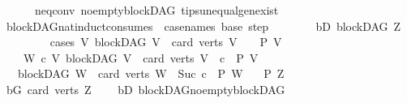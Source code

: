 \begin{isabellebody}
\ \ \ \ \ \ neq{}{\isacharunderscore}{\kern0pt}conv\ no{\isacharunderscore}{\kern0pt}empty{\isacharunderscore}{\kern0pt}blockDAG\ tips{\isacharunderscore}{\kern0pt}unequal{\isacharunderscore}{\kern0pt}gen{\isacharunderscore}{\kern0pt}exist{\isacharparenright}{\kern0pt}%
\endisatagproof
{\isafoldproof}%
%
\isadelimproof
\ \isanewline
%
\endisadelimproof
\isanewline
{}\isamarkupfalse%
\ blockDAG{\isacharunderscore}{\kern0pt}nat{\isacharunderscore}{\kern0pt}induct{\isacharbrackleft}{\kern0pt}consumes\ {}{\isacharcomma}{\kern0pt}\ case{\isacharunderscore}{\kern0pt}names\ base\ step{\isacharbrackright}{\kern0pt}{\isacharcolon}{\kern0pt}\ \isanewline
\ \ \isanewline
\ \ \ \ bD{\isacharcolon}{\kern0pt}\ {\isachardoublequoteopen}blockDAG\ Z{\isachardoublequoteclose}\isanewline
\ \ \ \ \isanewline
\ \ \ \ cases{\isacharcolon}{\kern0pt}\ {\isachardoublequoteopen}{\isasymAnd}V{\isachardot}{\kern0pt}\ {\isacharparenleft}{\kern0pt}blockDAG\ V\ {\isasymLongrightarrow}\ card\ {\isacharparenleft}{\kern0pt}verts\ V{\isacharparenright}{\kern0pt}\ {\isacharequal}{\kern0pt}\ {}\ {\isasymLongrightarrow}\ P\ V{\isacharparenright}{\kern0pt}{\isachardoublequoteclose}\isanewline
\ \ \ \ {\isachardoublequoteopen}{\isasymAnd}W\ c{\isachardot}{\kern0pt}\ {\isacharparenleft}{\kern0pt}{\isasymAnd}V{\isachardot}{\kern0pt}\ {\isacharparenleft}{\kern0pt}blockDAG\ V\ {\isasymLongrightarrow}\ card\ {\isacharparenleft}{\kern0pt}verts\ V{\isacharparenright}{\kern0pt}\ {\isacharequal}{\kern0pt}\ c\ {\isasymLongrightarrow}\ P\ V{\isacharparenright}{\kern0pt}{\isacharparenright}{\kern0pt}\ \isanewline
\ \ {\isasymLongrightarrow}\ {\isacharparenleft}{\kern0pt}blockDAG\ W\ {\isasymLongrightarrow}\ card\ {\isacharparenleft}{\kern0pt}verts\ W{\isacharparenright}{\kern0pt}\ {\isacharequal}{\kern0pt}\ Suc\ c\ {\isasymLongrightarrow}\ P\ W{\isacharparenright}{\kern0pt}{\isachardoublequoteclose}\isanewline
\ \ \ {\isachardoublequoteopen}P\ Z{\isachardoublequoteclose}\isanewline
%
\isadelimproof
%
\endisadelimproof
%
\isatagproof
{}\isamarkupfalse%
\ {\isacharminus}{\kern0pt}\ \isanewline
\ \ \isamarkupfalse%
\ bG{\isacharcolon}{\kern0pt}\ {\isachardoublequoteopen}card\ {\isacharparenleft}{\kern0pt}verts\ Z{\isacharparenright}{\kern0pt}\ {\isachargreater}{\kern0pt}\ {}{\isachardoublequoteclose}\ \isamarkupfalse%
\ bD\ blockDAG{\isachardot}{\kern0pt}no{\isacharunderscore}{\kern0pt}empty{\isacharunderscore}{\kern0pt}blockDAG\ \isamarkupfalse%

\end{isabellebody}
